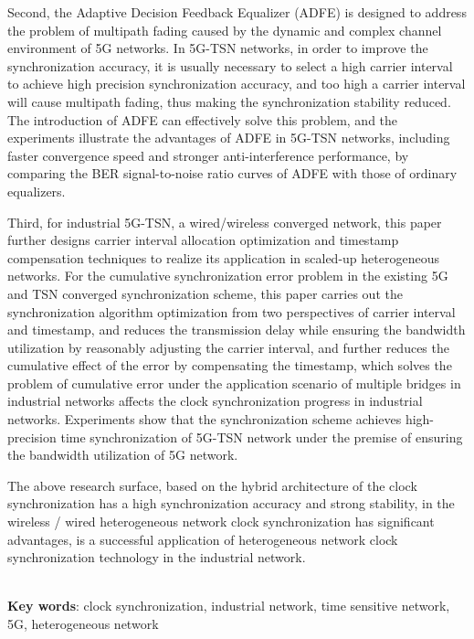 \documentclass[UTF8,a4paper,12pt]{ctexart}
\numberwithin{equation}{section}
\begin{document}
Second, the Adaptive Decision Feedback Equalizer (ADFE) is designed to address the problem of multipath fading caused by the dynamic and complex channel environment of 5G networks. In 5G-TSN networks, in order to improve the synchronization accuracy, it is usually necessary to select a high carrier interval to achieve high precision synchronization accuracy, and too high a carrier interval will cause multipath fading, thus making the synchronization stability reduced. The introduction of ADFE can effectively solve this problem, and the experiments illustrate the advantages of ADFE in 5G-TSN networks, including faster convergence speed and stronger anti-interference performance, by comparing the BER signal-to-noise ratio curves of ADFE with those of ordinary equalizers.

Third, for industrial 5G-TSN, a wired/wireless converged network, this paper further designs carrier interval allocation optimization and timestamp compensation techniques to realize its application in scaled-up heterogeneous networks. For the cumulative synchronization error problem in the existing 5G and TSN converged synchronization scheme, this paper carries out the synchronization algorithm optimization from two perspectives of carrier interval and timestamp, and reduces the transmission delay while ensuring the bandwidth utilization by reasonably adjusting the carrier interval, and further reduces the cumulative effect of the error by compensating the timestamp, which solves the problem of cumulative error under the application scenario of multiple bridges in industrial networks affects the clock synchronization progress in industrial networks. Experiments show that the synchronization scheme achieves high-precision time synchronization of 5G-TSN network under the premise of ensuring the bandwidth utilization of 5G network.

The above research surface, based on the hybrid architecture of the clock synchronization has a high synchronization accuracy and strong stability, in the wireless / wired heterogeneous network clock synchronization has significant advantages, is a successful application of heterogeneous network clock synchronization technology in the industrial network.

\hspace{8mm} \par 
~\\ 
\textbf{Key words}: clock synchronization, industrial network, time sensitive network, 5G, heterogeneous network
\end{document}
